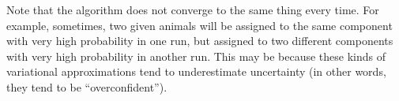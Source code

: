 \documentclass[12pt]{article}
\begin{document}
Note that the algorithm does not converge to the same thing every time. For example, sometimes, two given animals will be assigned to the same component with very high probability in one run, but assigned to two different components with very high probability in another run. This may be because these kinds of variational approximations tend to underestimate uncertainty (in other words, they tend to be ``overconfident'').








\end{document}
